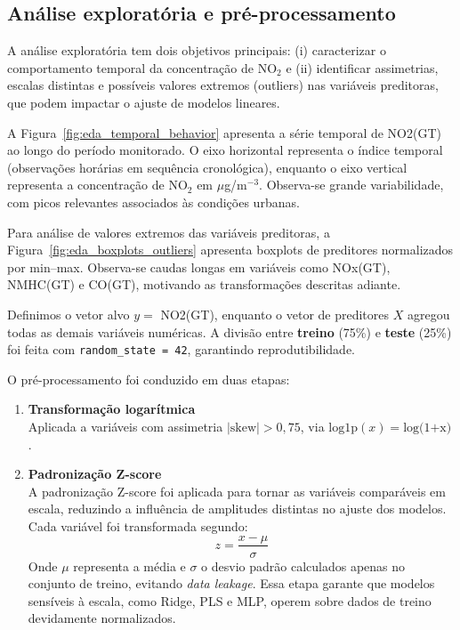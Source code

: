 \subsection{Análise exploratória e pré-processamento}
\label{subsec:eda}

A análise exploratória tem dois objetivos principais: (i) caracterizar o comportamento temporal da concentração de NO$_2$ e (ii) identificar assimetrias, escalas distintas e possíveis valores extremos (outliers) nas variáveis preditoras, que podem impactar o ajuste de modelos lineares.

A Figura~\ref{fig:eda_temporal_behavior} apresenta a série temporal de NO2(GT) ao longo do período monitorado. O eixo horizontal representa o índice temporal (observações horárias em sequência cronológica), enquanto o eixo vertical representa a concentração de NO$_2$ em $\mu$g/m$^{-3}$. Observa-se grande variabilidade, com picos relevantes associados às condições urbanas.

Para análise de valores extremos das variáveis preditoras, a Figura~\ref{fig:eda_boxplots_outliers} apresenta boxplots de preditores normalizados por min–max. Observa-se caudas longas em variáveis como NOx(GT), NMHC(GT) e CO(GT), motivando as transformações descritas adiante.

Definimos o vetor alvo $y =$ NO2(GT), enquanto o vetor de preditores $X$ agregou todas as demais variáveis numéricas. A divisão entre \textbf{treino} (75\%) e \textbf{teste} (25\%) foi feita com \texttt{random\_state = 42}, garantindo reprodutibilidade.

O pré-processamento foi conduzido em duas etapas:

\begin{enumerate}
\item \textbf{Transformação logarítmica}
\ \\ Aplicada a variáveis com assimetria $|\text{skew}| > 0{,}75$, via $\text{log1p}(x) = \text{log(1+x)}$  .
\item \textbf{Padronização Z-score}
\ \\ A padronização Z-score foi aplicada para tornar as variáveis comparáveis em escala, reduzindo a influência de amplitudes distintas no ajuste dos modelos. Cada variável foi transformada segundo: \begin{equation}
    z = \frac{x - \mu}{\sigma}
\end{equation}
Onde $\mu$ representa a média e $\sigma$ o desvio padrão calculados apenas no conjunto de treino, evitando \textit{data leakage}. Essa etapa garante que modelos sensíveis à escala, como Ridge, PLS e MLP, operem sobre dados de treino devidamente normalizados.
\end{enumerate}

